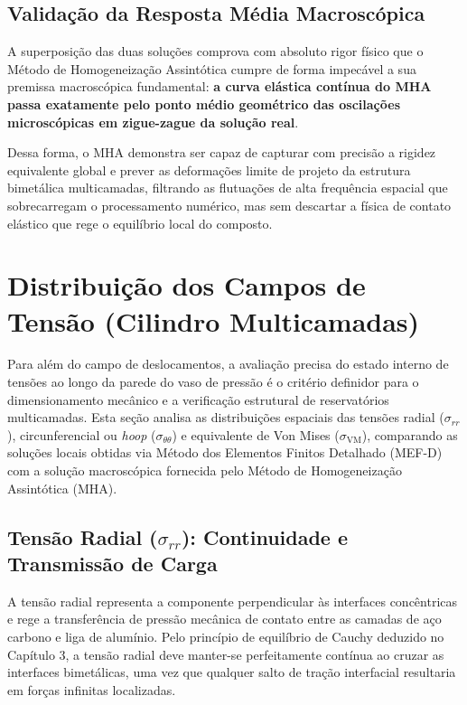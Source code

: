 \subsection{Validação da Resposta Média Macroscópica}

A superposição das duas soluções comprova com absoluto rigor físico que o Método de Homogeneização Assintótica cumpre de forma impecável a sua premissa macroscópica fundamental: \textbf{a curva elástica contínua do MHA passa exatamente pelo ponto médio geométrico das oscilações microscópicas em zigue-zague da solução real}.

Dessa forma, o MHA demonstra ser capaz de capturar com precisão a rigidez equivalente global e prever as deformações limite de projeto da estrutura bimetálica multicamadas, filtrando as flutuações de alta frequência espacial que sobrecarregam o processamento numérico, mas sem descartar a física de contato elástico que rege o equilíbrio local do composto.

\section{Distribuição dos Campos de Tensão (Cilindro Multicamadas)}\label{sec:distribuicao_tensoes}

Para além do campo de deslocamentos, a avaliação precisa do estado interno de tensões ao longo da parede do vaso de pressão é o critério definidor para o dimensionamento mecânico e a verificação estrutural de reservatórios multicamadas. Esta seção analisa as distribuições espaciais das tensões radial ($\sigma_{rr}$), circunferencial ou \textit{hoop} ($\sigma_{\theta\theta}$) e equivalente de Von Mises ($\sigma_{\text{VM}}$), comparando as soluções locais obtidas via Método dos Elementos Finitos Detalhado (MEF-D) com a solução macroscópica fornecida pelo Método de Homogeneização Assintótica (MHA).

\subsection{Tensão Radial ($\sigma_{rr}$): Continuidade e Transmissão de Carga}

A tensão radial representa a componente perpendicular às interfaces concêntricas e rege a transferência de pressão mecânica de contato entre as camadas de aço carbono e liga de alumínio. Pelo princípio de equilíbrio de Cauchy deduzido no Capítulo 3, a tensão radial deve manter-se perfeitamente contínua ao cruzar as interfaces bimetálicas, uma vez que qualquer salto de tração interfacial resultaria em forças infinitas localizadas.

